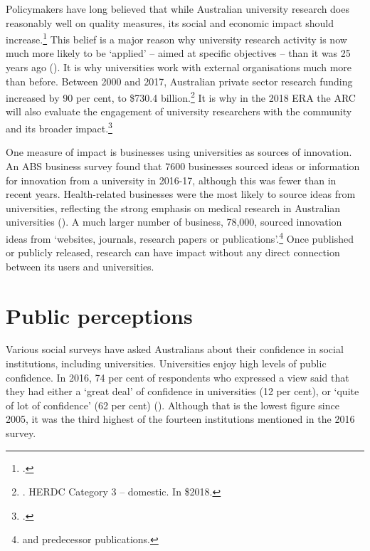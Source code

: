 \documentclass{grattan}
\begin{document}
Policymakers have long believed that while Australian university research does reasonably well on quality measures, its social and economic impact should increase.\footcites[][]{DepartmentofEducationDepartmentofIndustry2014boostingthecommer}[][65]{Dawkins1987highereducationa} This belief is a major reason why university research activity is now much more likely to be `applied' -- aimed at specific objectives -- than it was 25 years ago (). It is why universities work with external organisations much more than before. Between 2000 and 2017, Australian private sector research funding increased by 90 per cent, to \$730.4 billion.\footnote{\textcite[][]{DepartmentofEducationandTraining2017highereducationre}. HERDC Category 3 -- domestic. In \$2018.} It is why in the 2018 ERA the ARC will also evaluate the engagement of university researchers with the community and its broader impact.\footcite[][]{ARC2017ei2018framework}

One measure of impact is businesses using universities as sources of innovation. An ABS business survey found that 7600 businesses sourced ideas or information for innovation from a university in 2016-17, although this was fewer than in recent years. Health-related businesses were the most likely to source ideas from universities, reflecting the strong emphasis on medical research in Australian universities (). A much larger number of business, 78,000, sourced innovation ideas from `websites, journals, research papers or publications'.\footnote{\textcite[][]{ABS2018innovationinaustr} and predecessor publications.} Once published or publicly released, research can have impact without any direct connection between its users and universities.

%
\section{Public perceptions}\label{sec:public-perceptions}

Various social surveys have asked Australians about their confidence in social institutions, including universities. Universities enjoy high levels of public confidence. In 2016, 74 per cent of respondents who expressed a view said that they had either a `great deal' of confidence in universities (12 per cent), or `quite of lot of confidence' (62 per cent) (). Although that is the lowest figure since 2005, it was the third highest of the fourteen institutions mentioned in the 2016 survey.
\end{document}
